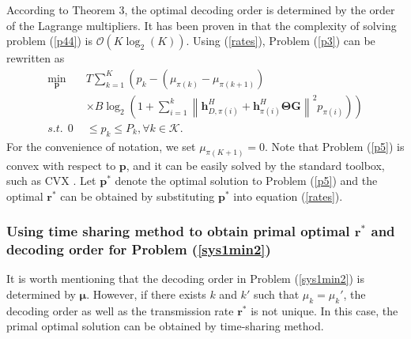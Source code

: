 \documentclass[journal]{IEEEtran}
\begin{document}
{According to Theorem 3, the optimal decoding order is determined by the order of the Lagrange multipliers. It has been proven in \cite[Lemma 3.2]{leD} that the complexity of solving problem (\ref{p44}) is $\mathcal{O}(K\log_2(K))$.
Using (\ref{rates}), Problem (\ref{p3}) can be rewritten as
\begin{subequations}\label{p5}
	\begin{align}
	\mathop{\min}_{\pmb p}\quad & T \sum_{k=1}^K\left(p_k-\left(\mu_{\pi(k)}-\mu_{\pi(k+1)}\right)
	\right.\\
	\nonumber
	~~~&
	\left.
	\times B \log_2\left(1+ {\sum_{i=1}^k \left\|\pmb h_{D,\pi(i)}^{H}+\pmb h_{\pi(i)}^{H} \pmb \Theta \pmb G\right\|^2  {p_{\pi(i)}}}\right)\right)\\
	s.t. ~~0&\leq p_k \leq P_k, \forall k \in \mathcal K.
	\end{align}
\end{subequations}}
For the convenience of notation, we set $\mu_{\pi(K+1)}=0$. Note that Problem (\ref {p5}) is convex with respect to $\pmb p$, and it can be easily solved by the standard toolbox, such as CVX \cite{cvx}. Let $\pmb p^*$ denote the optimal solution to Problem (\ref{p5}) and the optimal $\pmb r^*$ can be obtained by substituting $\pmb p^*$ into equation (\ref{rates}).

\subsubsection{Using time sharing method to obtain primal optimal $\pmb r^*$ and decoding order for Problem (\ref{sys1min2})}
It is worth mentioning that the decoding order in Problem (\ref{sys1min2}) is determined by $\pmb \mu$. However, if there exists $k$ and $k'$ such that $\mu_k=\mu_k'$, the decoding order as well as the transmission rate $\pmb r^*$ is not unique. In this case, the primal optimal solution can be obtained by time-sharing method.
\end{document}
